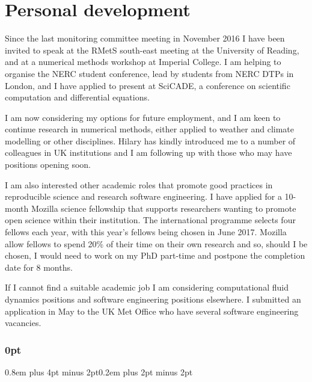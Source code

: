 \documentclass[a4paper,11pt]{article}
\begin{document}



\section{Personal development}

Since the last monitoring committee meeting in November 2016 I have been invited to speak at the RMetS south-east meeting at the University of Reading, and at a numerical methods workshop at Imperial College.  I am helping to organise the NERC student conference, lead by students from NERC DTPs in London, and I have applied to present at SciCADE, a conference on scientific computation and differential equations.

I am now considering my options for future employment, and I am keen to continue research in numerical methods, either applied to weather and climate modelling or other disciplines.
Hilary has kindly introduced me to a number of colleagues in UK institutions and I am following up with those who may have positions opening soon.

I am also interested other academic roles that promote good practices in reproducible science and research software engineering.
I have applied for a 10-month Mozilla science fellowship that supports researchers wanting to promote open science within their institution.
The international programme selects four fellows each year, with this year's fellows being chosen in June 2017.
Mozilla allow fellows to spend 20\% of their time on their own research and so, should I be chosen, I would need to work on my PhD part-time and postpone the completion date for 8 months.

If I cannot find a suitable academic job I am considering computational fluid dynamics positions and software engineering positions elsewhere.
I submitted an application in May to the UK Met Office who have several software engineering vacancies.


                                                 


\newpage

\titlespacing\subsubsection{0pt}{0.8em plus 4pt minus 2pt}{0.2em plus 2pt minus 2pt}
\end{document}
